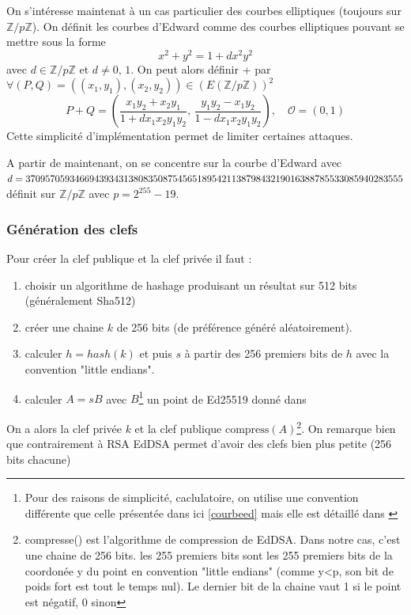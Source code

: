 \documentclass[a4paper, 12pt]{article}
\begin{document}
On s'intéresse maintenat à un cas particulier des courbes elliptiques (toujours sur $ \mathbb{Z}/p\mathbb{Z}$). On définit les courbes d'Edward comme des courbes elliptiques pouvant se mettre sous la forme 
$$
x^2 + y^2 = 1 + dx^2y^2
$$
avec $d \in \mathbb{Z}/p\mathbb{Z}$ et $d \neq 0,\, 1$. On peut alors définir + par
$
\forall (P,Q) = ((x_1,y_1),(x_2,y_2)) \in \left(E\left( \mathbb{Z}/p\mathbb{Z} \right)\right)^2
$
$$
P + Q = \left(\frac{x_1y_2+x_2y_1}{1+dx_1x_2y_1y_2},\, \frac{y_1y_2-x_1y_2}{1-dx_1x_2y_1y_2}\right), \quad \mathcal{O} = \left(0,1\right) 
$$
Cette simplicité d'implémentation permet de limiter certaines attaques. 

A partir de maintenant, on se concentre sur la courbe d'Edward avec $d = 3709570\\59346694393431380835087545651895421138798432190163887855330859402\\83555$ définit sur $ \mathbb{Z}/p\mathbb{Z}$ avec $p = 2^{255}-19$.


\subsubsection{Génération des clefs}
\noindent Pour créer la clef publique et la clef privée il faut :
\begin{enumerate}
	\item choisir un algorithme de hashage produisant un résultat sur 512 bits (généralement Sha512)
	\item créer une chaine $k$ de 256 bits (de préférence généré aléatoirement).
	\item calculer $h = hash(k)$ et puis $s$ à partir des 256 premiers bits de $h$ avec la convention "little endians".
	\item calculer $A = sB$ avec $B$\footnote{Pour des raisons de simplicité, caclulatoire, on utilise une convention différente que celle présentée dans ici \ref{courbeed} mais elle est détaillé dans \cite{eddsa}} un point de Ed25519 donné dans \cite{eddsa}\\
\end{enumerate}

On a alors la clef privée $k$ et la clef publique $\text{compress}(A)$\footnote{compresse() est l'algorithme de compression de EdDSA. Dans notre cas, c'est une chaine de 256 bits. les 255 premiers bits sont les 255 premiers bits de la coordonée y du point en convention "little endians" (comme y<p, son bit de poids fort est tout le temps nul). Le dernier bit de la chaine vaut 1 si le point est négatif, 0 sinon}. On remarque bien que contrairement à RSA EdDSA permet d'avoir des clefs bien plus petite (256 bits chacune)
\end{document}
